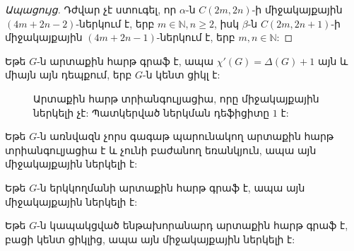\begin{hide}
\begin{proof}[Ապացույց]
Դժվար չէ ստուգել, որ $\alpha$-ն $C(2m,2n)$-ի միջակայքային $(4m+2n-2)$-ներկում է, երբ $m\in\mathbb{N},n\geq 2$,
իսկ $\beta$-ն $C(2m,2n+1)$-ի միջակայքային $(4m+2n-1)$-ներկում է, երբ $m,n\in\mathbb{N}$:
\end{proof}
\end{hide}

\begin{hide}
\begin{theorem}\cite{Fiorini1975}
Եթե $G$-ն արտաքին հարթ գրաֆ է, ապա $\chi'(G)=\Delta(G) + 1$ այն և միայն այն դեպքում, երբ $G$-ն կենտ ցիկլ է:
\end{theorem}

\begin{hide}
\begin{figure}
  \begin{center}
  \end{center}
  \caption{Արտաքին հարթ տրիանգուլյացիա, որը միջակայքային ներկելի չէ: Պատկերված ներկման դեֆիցիտը $1$ է:}
  \label{outerplanar-non-colorable}
\end{figure}
\end{hide}

\begin{theorem}\cite{Axenovich2002}
Եթե $G$-ն առնվազն չորս գագաթ պարունակող արտաքին հարթ տրիանգուլյացիա է և չունի բաժանող եռանկյուն, ապա այն միջակայքային ներկելի է:
\end{theorem}

\begin{theorem}\cite{GiaroKubale2004}
\label{t2_bipartite_outerplanar}
Եթե $G$-ն երկկողմանի արտաքին հարթ գրաֆ է, ապա այն միջակայքային ներկելի է:
\end{theorem}

\begin{theorem}\cite{Petrosyan2013Outerplanar}
Եթե $G$-ն կապակցված ենթախորանարդ արտաքին հարթ գրաֆ է, բացի կենտ ցիկլից, ապա այն միջակայքային ներկելի է:
\end{theorem}
\end{hide}

